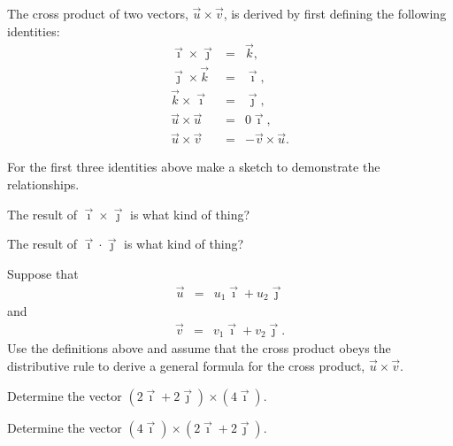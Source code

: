 \begin{problem}
\item The cross product of two vectors, $\vec{u}\times\vec{v}$, is
  derived by first defining  the following identities:
  \begin{eqnarray*}
    \vec{\imath} \times \vec{\jmath} & = & \vec{k}, \\
    \vec{\jmath} \times \vec{k} & = & \vec{\imath}, \\
    \vec{k} \times \vec{\imath} & = & \vec{\jmath}, \\
    \vec{u} \times \vec{u} & = & 0 \vec{\imath}, \\
    \vec{u} \times \vec{v} & = & - \vec{v} \times \vec{u}.
  \end{eqnarray*}
  \begin{subproblem}
  \item For the first three identities above make a sketch to
    demonstrate the relationships.
    \vfill

    \item The result of $\vec{\imath}\times\vec{\jmath}$ is what kind of thing?
    \vspace{3em}

    \item The result of $\vec{\imath}\cdot\vec{\jmath}$ is what kind of thing?
    \vspace{3em}

    \clearpage

  \item Suppose that
    \begin{eqnarray*}
      \vec{u} & = & u_1 \vec{\imath} + u_2 \vec{\jmath}
    \end{eqnarray*}
    and
    \begin{eqnarray*}
      \vec{v} & = & v_1 \vec{\imath} + v_2 \vec{\jmath}.
    \end{eqnarray*}
    Use the definitions above and assume that the cross product obeys
    the distributive rule to derive a general formula for the cross
    product, $\vec{u}\times\vec{v}$.
    \vfill
    \vfill

    \clearpage

  \item Determine the vector $\left(2 \vec{\imath} + 2\vec{\jmath}\right) \times \left(4 \vec{\imath}\right)$.
    \vfill

  \item Determine the vector $\left( 4 \vec{\imath} \right)  \times  \left( 2 \vec{\imath} + 2\vec{\jmath}\right)$.
    \vfill


\end{subproblem}
\end{problem}
